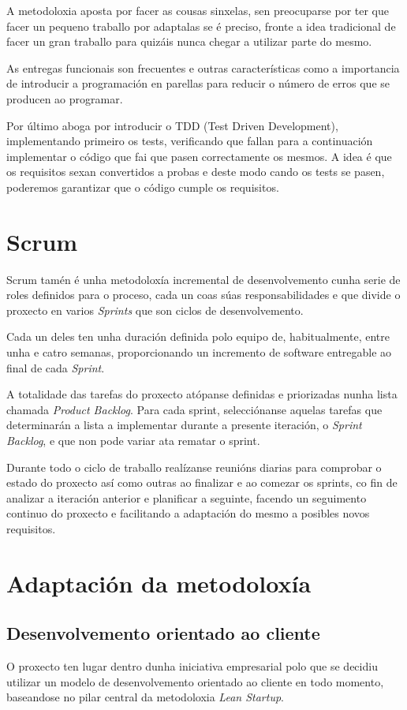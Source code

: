   A metodoloxia aposta por facer as cousas sinxelas, sen preocuparse por ter 
que facer un pequeno traballo por adaptalas se é preciso, fronte a idea 
tradicional de facer un gran traballo para quizáis nunca chegar a utilizar 
parte do mesmo.

  As entregas funcionais son frecuentes e outras características como a 
importancia de introducir a programación en parellas para reducir o número de 
erros que se producen ao programar.

  Por último aboga por introducir o TDD (Test Driven 
Development)\cite{book:cleancode}, implementando primeiro os tests, 
verificando que fallan para a continuación implementar o código que fai que 
pasen correctamente os mesmos.
  A idea é que os requisitos sexan convertidos a probas e deste modo cando os 
tests se pasen, poderemos garantizar que o código cumple os requisitos.

  \section{Scrum}
  Scrum\cite{book:scrum} tamén é unha metodoloxía incremental de desenvolvemento 
cunha serie de roles definidos para o proceso, cada un coas súas 
responsabilidades e que divide o proxecto en varios \emph{Sprints} que son 
ciclos de desenvolvemento.

  Cada un deles ten unha duración definida polo equipo de, habitualmente, 
entre unha e catro semanas, proporcionando un incremento de software entregable 
ao final de cada \emph{Sprint}.

  A totalidade das tarefas do proxecto atópanse definidas e priorizadas nunha 
lista chamada \emph{Product Backlog}. Para cada sprint, selecciónanse aquelas 
tarefas que determinarán a lista a implementar durante a presente iteración, o
\emph{Sprint Backlog}, e que non pode variar ata rematar o sprint.

  Durante todo o ciclo de traballo realízanse reunións diarias para comprobar o 
estado do proxecto así como outras ao finalizar e ao comezar os sprints, co 
fin de analizar a iteración anterior e planificar a seguinte, facendo un 
seguimento continuo do proxecto e facilitando a adaptación do mesmo a posibles 
novos requisitos.

  \section{Adaptación da metodoloxía}

    \subsection{Desenvolvemento orientado ao cliente}
      O proxecto ten lugar dentro dunha iniciativa empresarial polo que se 
decidiu utilizar un modelo de desenvolvemento orientado ao cliente en todo 
momento, baseandose no pilar central da metodoloxia \emph{Lean Startup}.

